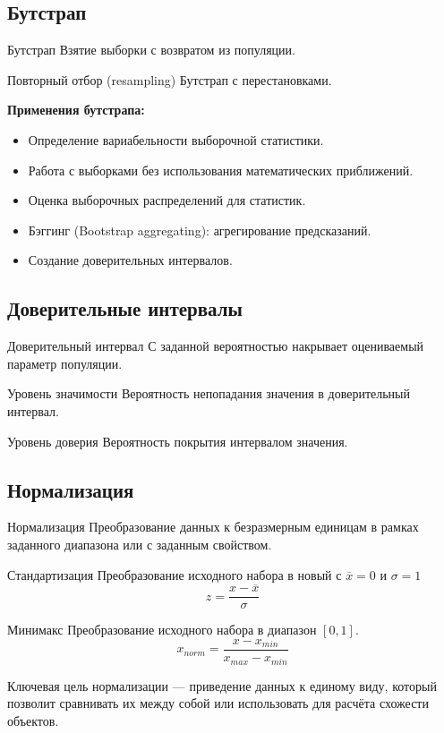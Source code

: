 \subsection{Бутстрап}
\begin{terms}
    \item[Бутстрап] Взятие выборки с возвратом из популяции.
    \item[Повторный отбор (resampling)] Бутстрап с перестановками.
\end{terms}
\textbf{Применения бутстрапа:}
\begin{itemize}
    \item Определение вариабельности выборочной статистики.
    \item Работа с выборками без использования математических приближений.
    \item Оценка выборочных распределений для статистик.
    \item Бэггинг (Bootstrap aggregating): агрегирование предсказаний.
    \item Создание доверительных интервалов.
\end{itemize}

\subsection{Доверительные интервалы}
\begin{terms}
    \item[Доверительный интервал] С заданной вероятностью накрывает оцениваемый параметр популяции.
    \item[Уровень значимости] Вероятность непопадания значения в доверительный интервал.
    \item[Уровень доверия] Вероятность покрытия интервалом значения.
\end{terms}

\subsection{Нормализация}
\begin{terms}
    \item[Нормализация] Преобразование данных к безразмерным единицам в рамках заданного диапазона
    или с заданным свойством.
    \item[Стандартизация] Преобразование исходного набора в новый с $\overline{x} = 0$ и $\sigma = 1$\\
    \begin{equation*}
        z = \frac{x - \overline{x}}{\sigma}
    \end{equation*}
    \item[Минимакс] Преобразование исходного набора в диапазон $[0, 1]$.
    \begin{equation*}
        x_{norm} = \frac{x - x_{min}}{x_{max} - x_{min}}
    \end{equation*}
\end{terms}
Ключевая цель нормализации --- приведение данных к единому виду,
который позволит сравнивать их между собой или использовать для расчёта схожести объектов.


